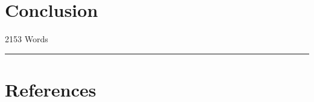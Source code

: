 \documentclass[
  11pt,
]{article}
\begin{document}
\hypertarget{conclusion}{%
\section{Conclusion}\label{conclusion}}

\begin{flushright}
2153 Words
\end{flushright}
\footnotesize

\begin{center}\rule{0.5\linewidth}{0.5pt}\end{center}

\hypertarget{references}{%
\section*{References}\label{references}}
\end{document}
